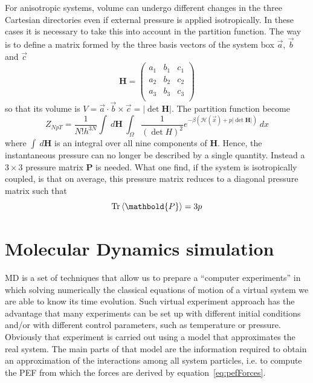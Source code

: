 For anisotropic systems, volume can undergo different changes in the three Cartesian directories even if external
pressure is applied isotropically. In these cases it is necessary to take this into account in the partition
function. The way is to define a matrix formed by the three basis vectors of the system box $\vec a$, $\vec b$
and $\vec c$
\begin{equation}
	 \mathbold{H} =
	\begin{pmatrix}
		a_1 & b_1 & c_1 \\
		a_2 & b_2 & c_2 \\
		a_3 & b_3 & c_3 \\
	\end{pmatrix}
	\label{eq:volumeMatrix}
\end{equation}
so that its volume is $V = \vec a\cdot \vec b\times \vec c = |\det{ \mathbold{H}}|$. The partition function become
\begin{equation*}
	Z_{NpT} = \frac{1}{N!h^{3N}}\int\ d \mathbold{H} \ \int_\Omega \frac{1}{(\det{H})^2} e^{-\beta(\mathcal{H}(\vec x) + p|\det{ \mathbold{H}}|)}\ dx
\end{equation*}
where $\int\ d\mathbold{H}$ is an integral over all nine components of $\mathbold{H}$. Hence, the instantaneous
pressure can no longer be described by a single quantity. Instead a $3\times 3$ pressure matrix $ \mathbold{P}$
is needed. What one find, if the system is isotropically coupled, is that on average, this pressure matrix
reduces to a diagonal pressure matrix such that
\begin{equation*}
	\text{Tr}\ave{ \mathbold{P}} = 3p
\end{equation*}


\section{Molecular Dynamics simulation}
\label{sec:MD}
\acf{MD} is a set of techniques that allow us to prepare a ``computer experiments'' in which solving numerically
the classical equations of motion of a virtual system we are able to know its time evolution. Such virtual
experiment approach has the advantage that many experiments can be set up with different initial conditions
and/or with different control parameters, such as temperature or pressure. Obviously that experiment is carried
out using a model that approximates the real system. The main parts of that model are the information required to
obtain an approximation of the interactions among all system particles, i.e. to compute the \ac{PEF} from which
the forces are derived by equation~\eqref{eq:pefForces}.

